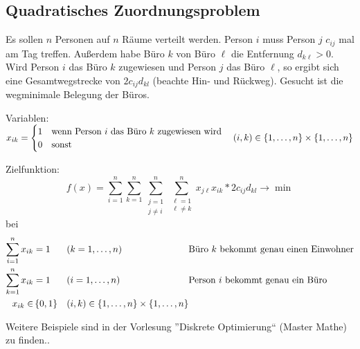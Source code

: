\subsection{Quadratisches Zuordnungsproblem}

Es sollen $n$ Personen auf $n$ Räume verteilt werden. Person $i$ muss Person $j$ $c_{ij}$ mal am Tag treffen. Außerdem habe Büro $k$ von Büro $\ell$ die Entfernung $d_{k \ell}>0$. Wird Person $i$ das Büro $k$ zugewiesen und Person $j$ das Büro $\ell$, so ergibt sich eine Gesamtwegstrecke von $2 c_{ij} d_{kl}$ (beachte Hin- und Rückweg). Gesucht ist die wegminimale Belegung der Büros.

Variablen: $x_{ik} = \begin{cases}
	1 & \text{wenn Person $i$ das Büro $k$ zugewiesen wird} \\ 0 & \text{sonst}
	\end{cases} \quad (i,k) \in \left\{ 1, \dots , n \right\} \times \left\{ 1, \dots , n \right\}$
	
Zielfunktion:
\begin{equation*}
	f(x) = \sum_{i=1}^n \sum_{k=1}^n \sum\limits_{\substack{j=1 \\ j \neq i}}^n \sum\limits_{\substack{\ell =1 \\ \ell \neq k}}^n x_{j \ell} x_{i k} * 2c_{ij} d_{kl} \to \min
\end{equation*}
bei
\begin{equation*}
	\begin{alignedat}{3}
	\sum_{i=1}^n x_{ik} &= 1 \quad &&(k = 1, \dots, n) \quad &&\text{Büro $k$ bekommt genau einen Einwohner} \\
	\sum_{k=1}^n x_{ik} &= 1 &&(i = 1, \dots, n) &&\text{Person $i$ bekommt genau ein Büro} \\
	x_{ik} \in &\left\{ 0,1 \right\} \quad &&(i,k) \in \left\{ 1, \dots , n \right\} \times \left\{ 1, \dots , n \right\} &&
	\end{alignedat}
\end{equation*}

Weitere Beispiele sind in der Vorlesung ''Diskrete Optimierung`` (Master Mathe) zu finden..